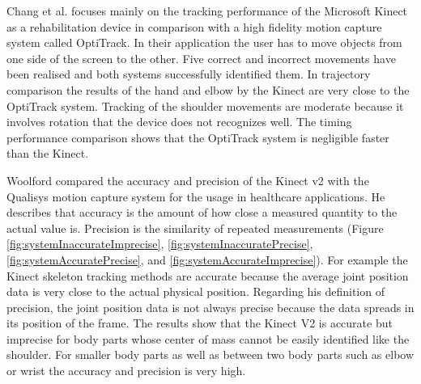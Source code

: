 Chang et al. \cite{Chang2012-hz} focuses mainly on the tracking performance of the Microsoft Kinect as a rehabilitation device in comparison with a high fidelity motion capture system called OptiTrack. In their application the user has to move objects from one side of the screen to the other. Five correct and incorrect movements have been realised and both systems successfully identified them. In trajectory comparison the results of the hand and elbow by the Kinect are very close to the OptiTrack system. Tracking of the shoulder movements are moderate because it involves rotation that the device does not recognizes well. The timing performance comparison shows that the OptiTrack system is negligible faster than the Kinect.

Woolford \cite{Woolford2015-ub} compared the accuracy and precision of the Kinect v2 with the Qualisys motion capture system for the usage in healthcare applications. He describes that accuracy is the amount of how close a measured quantity to the actual value is. Precision is the similarity of repeated measurements (Figure \ref{fig:systemInaccurateImprecise}, \ref{fig:systemInaccuratePrecise}, \ref{fig:systemAccuratePrecise}, and \ref{fig:systemAccurateImprecise}). For example the Kinect skeleton tracking methods are accurate because the average joint position data is very close to the actual physical position. Regarding his definition of precision, the joint position data is not always precise because the data spreads in its position of the frame. The results show that the Kinect V2 is accurate but imprecise for body parts whose center of mass cannot be easily identified like the shoulder. For smaller body parts as well as between two body parts such as elbow or wrist the accuracy and precision is very high. 

